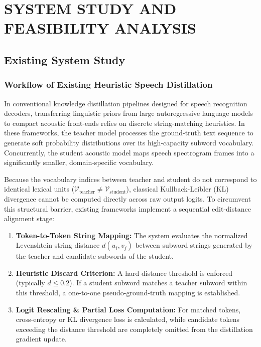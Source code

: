 \chapter{SYSTEM STUDY AND FEASIBILITY ANALYSIS}
\label{ch:system_study}

\section{Existing System Study}

\subsection{Workflow of Existing Heuristic Speech Distillation}
In conventional knowledge distillation pipelines designed for speech recognition decoders, transferring linguistic priors from large autoregressive language models to compact acoustic front-ends relies on discrete string-matching heuristics. In these frameworks, the teacher model processes the ground-truth text sequence to generate soft probability distributions over its high-capacity subword vocabulary. Concurrently, the student acoustic model maps speech spectrogram frames into a significantly smaller, domain-specific vocabulary.

Because the vocabulary indices between teacher and student do not correspond to identical lexical units ($\mathcal{V}_{\text{teacher}} \ne \mathcal{V}_{\text{student}}$), classical Kullback-Leibler (KL) divergence cannot be computed directly across raw output logits. To circumvent this structural barrier, existing frameworks implement a sequential edit-distance alignment stage:
\begin{enumerate}
    \item \textbf{Token-to-Token String Mapping:} The system evaluates the normalized Levenshtein string distance $d(u_i, v_j)$ between subword strings generated by the teacher and candidate subwords of the student.
    \item \textbf{Heuristic Discard Criterion:} A hard distance threshold is enforced (typically $d \le 0.2$). If a student subword matches a teacher subword within this threshold, a one-to-one pseudo-ground-truth mapping is established.
    \item \textbf{Logit Rescaling & Partial Loss Computation:} For matched tokens, cross-entropy or KL divergence loss is calculated, while candidate tokens exceeding the distance threshold are completely omitted from the distillation gradient update.
\end{enumerate}


